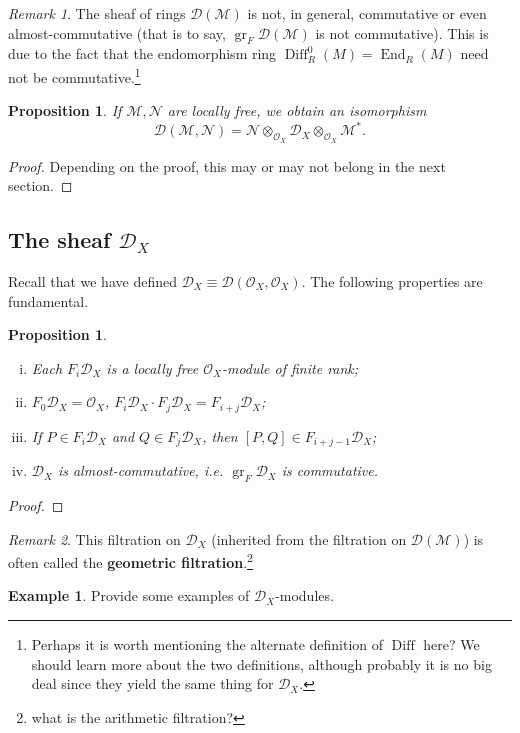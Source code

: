 \documentclass{article}
\theoremstyle{plain}
\newtheorem{proposition}[theorem]{Proposition}
\theoremstyle{definition}
\newtheorem{example}[theorem]{Example}
\theoremstyle{remark}
\newtheorem*{remark}{Remark}
\DeclareMathOperator{\End}{End}
\DeclareMathOperator{\Diff}{Diff}
\DeclareMathOperator{\gr}{gr}
\begin{document}
\begin{remark}
    The sheaf of rings $\mathcal{D}(\mathcal{M})$ is not, in general, commutative or even
    almost-commutative (that is to say, $\gr_F \mathcal{D}(\mathcal{M})$ is not commutative).
    This is due to the fact that the endomorphism ring $\Diff_R^0(M)=\End_R(M)$ need not be
    commutative.\footnote{Perhaps it is worth mentioning the alternate definition of $\Diff$ here? We
    should learn more about the two definitions, although probably it is no big deal since
    they yield the same thing for $\mathcal{D}_X$.}
\end{remark}

\begin{proposition}
    If $\mathcal{M},\mathcal{N}$ are locally free, we obtain an isomorphism
    \[\mathcal{D}(\mathcal{M},\mathcal{N})=\mathcal{N}\otimes_{\mathcal{O}_X}\mathcal{D}_X\otimes_{\mathcal{O}_X}\mathcal{M}^*.\]
\end{proposition}
\begin{proof}
    Depending on the proof, this may or may not belong in the next section.
\end{proof}

\subsection{The sheaf $\mathcal{D}_X$}

Recall that we have defined $\mathcal{D}_X\equiv\mathcal{D}(\mathcal{O}_X,\mathcal{O}_X)$.
The following properties are fundamental.

\begin{proposition}\hspace{1mm}
    \begin{enumerate}[(i)]
        \item Each $F_i\mathcal{D}_X$ is a locally free $\mathcal{O}_X$-module of finite rank;
        \item $F_0\mathcal{D}_X=\mathcal{O}_X$, $F_i\mathcal{D}_X\cdot F_j\mathcal{D}_X=F_{i+j}\mathcal{D}_X$;
        \item If $P\in F_i\mathcal{D}_X$ and $Q\in F_j\mathcal{D}_X$, then $[P,Q]\in F_{i+j-1}\mathcal{D}_X$;
        \item $\mathcal{D}_X$ is almost-commutative, i.e. $\gr_F\mathcal{D}_X$ is commutative.
    \end{enumerate}
\end{proposition}
\begin{proof}
    
\end{proof}

\begin{remark}
    This filtration on $\mathcal{D}_X$ (inherited from the filtration on $\mathcal{D}(\mathcal{M})$)
    is often called the \textbf{geometric filtration}.\footnote{what is the arithmetic filtration?}
\end{remark}

\begin{example}
    Provide some examples of $\mathcal{D}_X$-modules.
\end{example}


\end{document}

